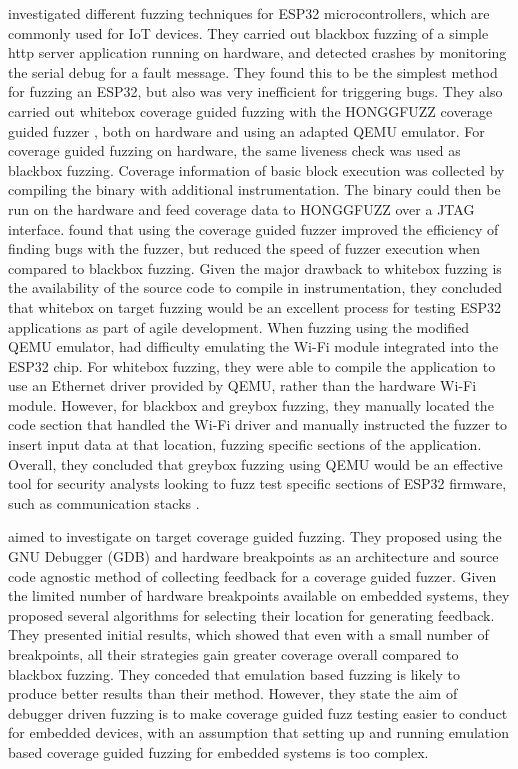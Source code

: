 \documentclass[../report.tex]{subfiles}
\begin{document}
\citet{Borsig_2020} investigated different fuzzing techniques for ESP32
microcontrollers, which are commonly used for IoT devices. They carried out
blackbox fuzzing of a simple http server application running on hardware, and
detected crashes by monitoring the serial debug for a fault message. They found
this to be the simplest method for fuzzing an ESP32, but also was very
inefficient for triggering bugs. They also carried out whitebox coverage guided
fuzzing with the HONGGFUZZ coverage guided fuzzer \citep{Honggfuzz}, both on
hardware and using an adapted QEMU emulator. For coverage guided fuzzing on
hardware, the same liveness check was used as blackbox fuzzing. Coverage
information of basic block execution was collected by compiling the binary with
additional instrumentation. The binary could then be run on the hardware and
feed coverage data to HONGGFUZZ over a JTAG interface. \citet{Borsig_2020}
found that using the coverage guided fuzzer improved the efficiency of finding
bugs with the fuzzer, but reduced the speed of fuzzer execution when compared
to blackbox fuzzing. Given the major drawback to whitebox fuzzing is the
availability of the source code to compile in instrumentation, they concluded
that whitebox on target fuzzing would be an excellent process for testing ESP32
applications as part of agile development. When fuzzing using the modified QEMU
emulator, \citet{Borsig_2020} had difficulty emulating the Wi-Fi module
integrated into the ESP32 chip. For whitebox fuzzing, they were able to compile
the application to use an Ethernet driver provided by QEMU, rather than the
hardware Wi-Fi module. However, for blackbox and greybox fuzzing, they manually
located the code section that handled the Wi-Fi driver and manually instructed
the fuzzer to insert input data at that location, fuzzing specific sections of
the application. Overall, they concluded that greybox fuzzing using QEMU would
be an effective tool for security analysts looking to fuzz test specific
sections of ESP32 firmware, such as communication stacks \citep{Borsig_2020}.

\citet{Eisele_2022} aimed to investigate on target coverage guided fuzzing.
They proposed using the GNU Debugger (GDB) and hardware breakpoints as an
architecture and source code agnostic method of collecting feedback for a
coverage guided fuzzer. Given the limited number of hardware breakpoints
available on embedded systems, they proposed several algorithms for selecting
their location for generating feedback. They presented initial results, which
showed that even with a small number of breakpoints, all their strategies gain
greater coverage overall compared to blackbox fuzzing. They conceded that
emulation based fuzzing is likely to produce better results than their method.
However, they state the aim of debugger driven fuzzing is to make coverage
guided fuzz testing easier to conduct for embedded devices, with an assumption
that setting up and running emulation based coverage guided fuzzing for
embedded systems is too complex.
\end{document}
